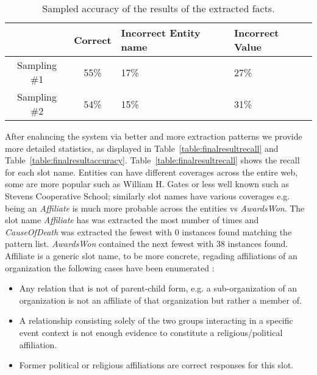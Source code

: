 \begin{table}
\caption{Sampled accuracy of the results of the extracted facts.}
\centering
\label{table:initialresult}

\begin{tabular}{| c | c | p{2cm} | p{13mm} |}
\hline 
 & \textbf{Correct} & \textbf{Incorrect Entity name} & \textbf{Incorrect Value} \\ 
\hline 
Sampling \#1 & 55\% & 17\% & 27\% \\ 
\hline Sampling \#2 & 54\% & 15\% & 31\%  \\ 
\hline 
\end{tabular} 
\end{table}


After enahncing the system via better and more extraction patterns  we provide more detailed statistics, as displayed in Table~\ref{table:finalresultrecall} and Table~\ref{table:finalresultaccuracy}.
Table~\ref{table:finalresultrecall} shows the recall for each slot name. 
Entities can have different coverages across the entire web, some are more popular such as William H. Gates or less well known such as Stevens Cooperative School; similarly slot names have various coverages e.g. being an \textit{Affiliate} is much more probable across the entities vs \textit{AwardsWon}. %
The slot name \textit{Affiliate} has was extracted the most number of times and \textit{CauseOfDeath} was extracted the
fewest with 0 instances found matching the pattern list. \textit{AwardsWon} contained the next fewest with 38 instances found. 
Affiliate is a generic slot name, to be more concrete, regading affiliations of an organization the following cases have been enumerated \cite{tackbp}: 

\begin{itemize}
\item  Any relation that is not of parent-child form, e.g. a sub-organization of an organization is not an affiliate of that organization but rather a member of.
\item  A relationship consisting solely of the two groups
interacting in a specific event context is not enough evidence to constitute a religious/political affiliation. 
\item Former political or religious affiliations are correct responses for this slot. 


\end{itemize}

